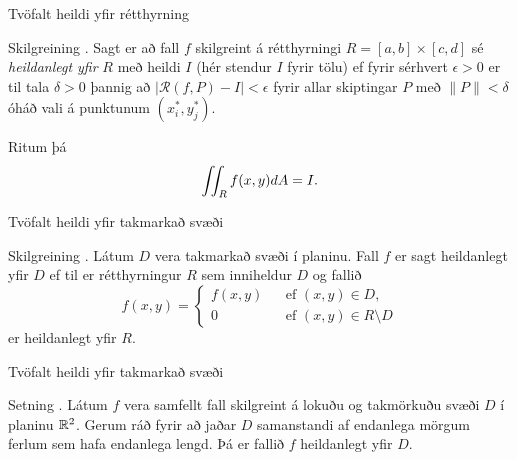 \begin{frame}{\nopagebreak Tvöfalt heildi yfir rétthyrning} 

\begin {block}{\nopagebreak Skilgreining \kaflanr.}
Sagt er að fall $f$ skilgreint á
rétthyrningi $R=[a,b]\times [c,d]$ sé {\em heildanlegt yfir} $R$ með
heildi $I$ (hér stendur $I$ fyrir tölu) ef fyrir sérhvert
$\epsilon>0$ er til tala $\delta>0$ 
þannig að $|\mathcal{R}(f,P)-I|<\epsilon$ fyrir allar skiptingar $P$ með
$\|P\|<\delta$ óháð vali á punktunum $(x_i^*, y_j^*)$.

Ritum þá 
$$\int\!\!\!\int_R f(x,y)dA=I.$$
\end{block}

\end{frame}



\begin{frame}{Tvöfalt heildi yfir takmarkað svæði} 

\begin {block}{Skilgreining \kaflanr.}
Látum $D$ vera takmarkað svæði í planinu.
Fall $f$ er sagt heildanlegt yfir $D$ ef til er rétthyrningur $R$ sem
inniheldur $D$ og fallið 
$$\hat{f}(x,y)=\left\{\begin{array}{rcl}
f(x,y)& & \mbox{ef }(x,y)\in D,\\
0& & \mbox{ef }(x,y)\in R\setminus D
\end{array}\right.$$
er heildanlegt yfir $R$.
\end{block}

\end{frame}


\begin{frame}{Tvöfalt heildi yfir takmarkað svæði} 

\begin {block}{Setning \kaflanr.}
Látum $f$ vera samfellt fall skilgreint á
lokuðu og takmörkuðu svæði $D$ í planinu ${\mathbb R}^2$.  Gerum ráð fyrir að
jaðar $D$ samanstandi af endanlega mörgum ferlum sem hafa endanlega
lengd.  Þá er fallið $f$ heildanlegt yfir $D$.
\end{block}

\end{frame}


